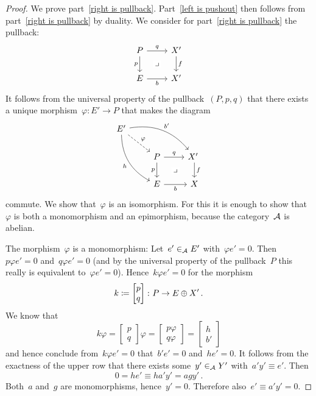 \begin{proof}
  We prove part~\ref*{right is pullback}.
  Part~\ref*{left is pushout} then follows from part~\ref*{right is pullback} by duality.
  We consider for part~\ref*{right is pullback} the pullback:
  \[
    \begin{tikzcd}
      P
      \arrow{r}[above]{q}
      \arrow[phantom]{dr}[description]{\pb}
      \arrow{d}[left]{p}
      &
      X'
      \arrow{d}[right]{f}
      \\
      E
      \arrow{r}[below]{b}
      &
      X'
    \end{tikzcd}
  \]
  It follows from the universal property of the pullback~$(P,p,q)$ that there exists a unique morphism~$\varphi \colon E' \to P$ that makes the diagram
  \[
    \begin{tikzcd}
          E'
          \arrow[bend left]{drr}[above right]{b'}
          \arrow[dashed]{dr}[above right]{\varphi}
          \arrow[bend right]{ddr}[below left]{h}
        & {}
        & {}
        \\
          {}
        & P
          \arrow{r}[above]{q}
          \arrow[phantom]{dr}[description]{\pb}
          \arrow{d}[left]{p}
        & X'
          \arrow{d}[right]{f}
          \
        \\
          {}
        & E
          \arrow{r}[below]{b}
        & X
    \end{tikzcd}
  \]
  commute.
  We show that~$\varphi$ is an isomorphism.
  For this it is enough to show that~$\varphi$ is both a monomorphism and an epimorphism, because the category~$\mathcal{A}$ is abelian.
  
  The morphism~$\varphi$ is a monomorphism:
  Let~$e' \in_{\mathcal{A}} E'$ with~$\varphi e' = 0$.
  Then~$p \varphi e' = 0$ and~$q \varphi e' = 0$ (and by the universal property of the pullback~$P$ this really is equivalent to~$\varphi e' = 0$).
  Hence~$k \varphi e' = 0$ for the morphism
  \[
    k
    \coloneqq
    \begin{bmatrix}
      p \\
      q
    \end{bmatrix}
    \colon
    P
    \to
    E \oplus X' \,.
  \]
  We know that
  \[
    k \varphi
    =
    \begin{bmatrix}
      p \\
      q
    \end{bmatrix}
    \varphi
    =
    \begin{bmatrix}
      p \varphi \\
      q \varphi
    \end{bmatrix}
    =
    \begin{bmatrix}
      h     \\
      b'
    \end{bmatrix}
  \]
  and hence conclude from~$k \varphi e' = 0$ that~$b' e' = 0$ and~$h e' = 0$.
  It follows from the exactness of the upper row that there exists some~$y' \in_{\mathcal{A}} Y'$ with~$a' y' \equiv e'$.
  Then
  \[
    0
    =
    h e'
    \equiv
    h a' y'
    =
    a g y'  \,.
  \]
  Both~$a$ and~$g$ are monomorphisms, hence~$y' = 0$.
  Therefore also~$e' \equiv a' y' = 0$.
  

\end{proof}
